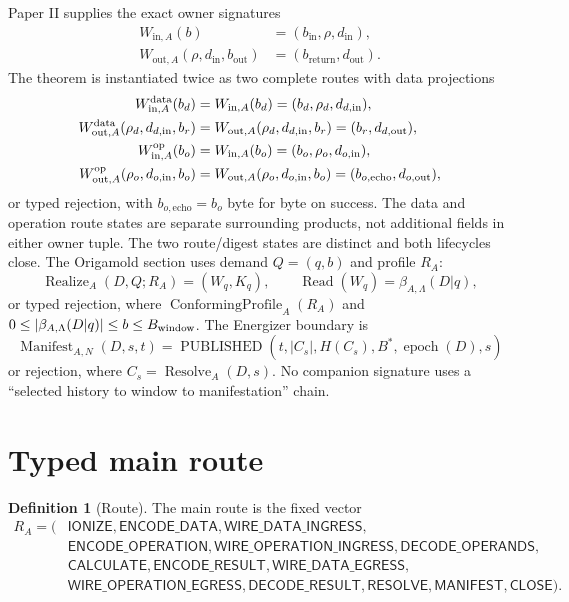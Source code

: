 \documentclass[11pt,letterpaper]{article}
\newcommand{\Resolve}{\operatorname{Resolve}}
\newcommand{\Manifest}{\operatorname{Manifest}}
\theoremstyle{definition}
\newtheorem{definition}[theorem]{Definition}
\begin{document}
Paper II supplies the exact owner signatures
\begin{align}
 W_{\mathrm{in},A}(b)&=(b_{\mathrm{in}},\rho,d_{\mathrm{in}}),\\
 W_{\mathrm{out},A}(\rho,d_{\mathrm{in}},b_{\mathrm{out}})
  &=(b_{\mathrm{return}},d_{\mathrm{out}}).
\end{align}
The theorem is instantiated twice as two complete routes with data projections
\begin{align}
 W^{\rm data}_{\mathrm{in},A}(b_d)&=W_{\mathrm{in},A}(b_d)
   =(b_d,\rho_d,d_{d,\mathrm{in}}),\\
 W^{\rm data}_{\mathrm{out},A}(\rho_d,d_{d,\mathrm{in}},b_r)
  &=W_{\mathrm{out},A}(\rho_d,d_{d,\mathrm{in}},b_r)
    =(b_r,d_{d,\mathrm{out}}),\\
 W^{\rm op}_{\mathrm{in},A}(b_o)&=W_{\mathrm{in},A}(b_o)
   =(b_o,\rho_o,d_{o,\mathrm{in}}),\\
 W^{\rm op}_{\mathrm{out},A}(\rho_o,d_{o,\mathrm{in}},b_o)
  &=W_{\mathrm{out},A}(\rho_o,d_{o,\mathrm{in}},b_o)
    =(b_{o,\mathrm{echo}},d_{o,\mathrm{out}}),
\end{align}
or typed rejection, with $b_{o,\mathrm{echo}}=b_o$ byte for byte on success.
The data and operation route states are separate surrounding products, not
additional fields in either owner tuple.  The two route/digest states are
distinct and both lifecycles close.  The
Origamold section uses demand $Q=(q,b)$ and profile $R_A$:
\[
 \operatorname{Realize}_A(D,Q;R_A)=(W_q,K_q),
\qquad \operatorname{Read}(W_q)=\beta_{A,\Lambda}(D|q),
\]
or typed rejection, where $\operatorname{ConformingProfile}_A(R_A)$ and
$0\le |\beta_{A,\Lambda}(D|q)|\le b\le B_{\rm window}$.  The Energizer boundary is
\[
\Manifest_{A,N}(D,s,t)=
\operatorname{PUBLISHED}(t,|C_s|,H(C_s),B^*,\operatorname{epoch}(D),s)
\]
or rejection, where $C_s=\Resolve_A(D,s)$.  No companion signature uses a
``selected history to window to manifestation'' chain.

\section{Typed main route}

\begin{definition}[Route]
The main route is the fixed vector
\[
\begin{aligned}
 R_A=(&\mathsf{IONIZE},\mathsf{ENCODE\_DATA},\mathsf{WIRE\_DATA\_INGRESS},\\
&\mathsf{ENCODE\_OPERATION},\mathsf{WIRE\_OPERATION\_INGRESS},
 \mathsf{DECODE\_OPERANDS},\\
&\mathsf{CALCULATE},\mathsf{ENCODE\_RESULT},\mathsf{WIRE\_DATA\_EGRESS},\\
&\mathsf{WIRE\_OPERATION\_EGRESS},\mathsf{DECODE\_RESULT},
 \mathsf{RESOLVE},\mathsf{MANIFEST},\mathsf{CLOSE}).
\end{aligned}
\]
\end{definition}
\end{document}
